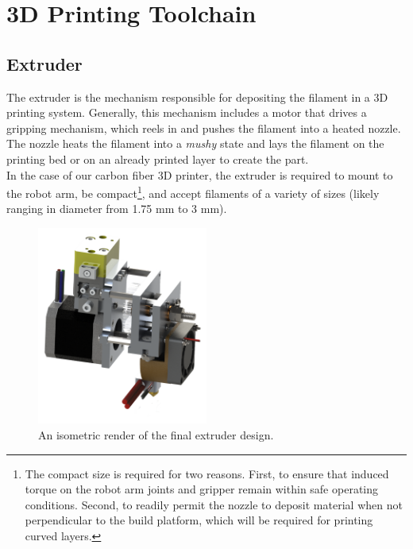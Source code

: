 \section{3D Printing Toolchain}

\subsection{Extruder}

\indent

The extruder is the mechanism responsible for depositing the filament in a 3D printing system. Generally, this mechanism includes a motor that drives a gripping mechanism, which reels in and pushes the filament into a heated nozzle. The nozzle heats the filament into a \emph{mushy} state and lays the filament on the printing bed or on an already printed layer to create the part.\\

In the case of our carbon fiber 3D printer, the extruder is required to mount to the robot arm, be compact\footnote{The compact size is required for two reasons. First, to ensure that induced torque on the robot arm joints and gripper remain within safe operating conditions. Second, to readily permit the nozzle to deposit material when not perpendicular to the build platform, which will be required for printing curved layers.}, and accept filaments of a variety of sizes (likely ranging in diameter from 1.75 mm to 3 mm).  

\begin{figure}[htp]
\centering
\includegraphics[width=0.5\textwidth]{./figures/extruder-iso}
\caption{An isometric render of the final extruder design.}
\label{fig:flowchart}
\end{figure}

